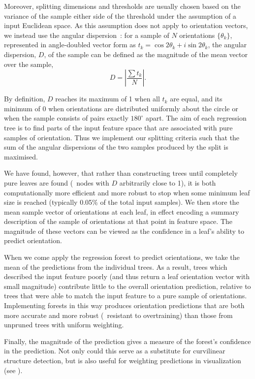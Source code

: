 Moreover, splitting dimensions and thresholds are usually chosen based on the variance of the sample either side of the threshold under the assumption of a input Euclidean space. As this assumption does not apply to orientation vectors, we instead use the angular dispersion~\cite{Mardia_Jupp_00}: for a sample of $N$ orientations $\{\theta_k\}$, represented in angle-doubled vector form as $t_k = \cos 2\theta_k + i\sin 2\theta_k$, the angular dispersion, $D$, of the sample can be defined as the magnitude of the mean vector over the sample,
%
\begin{equation}
D = |\frac{\sum{t_k}}{N}|.
\label{e:2d}
\end{equation}

By definition, $D$ reaches its maximum of 1 when all $t_k$ are equal, and its minimum of 0 when orientations are distributed uniformly about the circle or when the sample consists of pairs exactly $180^\circ$ apart. The aim of each regression tree is to find parts of the input feature space that are associated with pure samples of orientation. Thus we implement our splitting criteria such that the sum of the angular dispersions of the two samples produced by the split is maximised.

We have found, however, that rather than constructing trees until completely pure leaves are found (\ie~nodes with $D$ arbitrarily close to 1), it is both computationally more efficient and more robust to stop when some minimum leaf size is reached (typically 0.05\% of the total input samples). We then store the mean sample vector of orientations at each leaf, in effect encoding a summary description of the sample of orientations at that point in feature space. The magnitude of these vectors can be viewed as the confidence in a leaf's ability to predict orientation. 

When we come apply the regression forest to predict orientations, we take the mean of the predictions from the individual trees. As a result, trees which described the input feature poorly (and thus return a leaf orientation vector with small magnitude) contribute little to the overall orientation prediction, relative to trees that were able to match the input feature to a pure sample of orientations. Implementing forests in this way produces orientation predictions that are both more accurate and more robust (\ie~resistant to overtraining) than those from unpruned trees with uniform weighting. 

Finally, the magnitude of the prediction gives a measure of the forest's confidence in the prediction. Not only could this serve as a substitute for curvilinear structure detection, but is also useful for weighting predictions in visualization (see ). 


